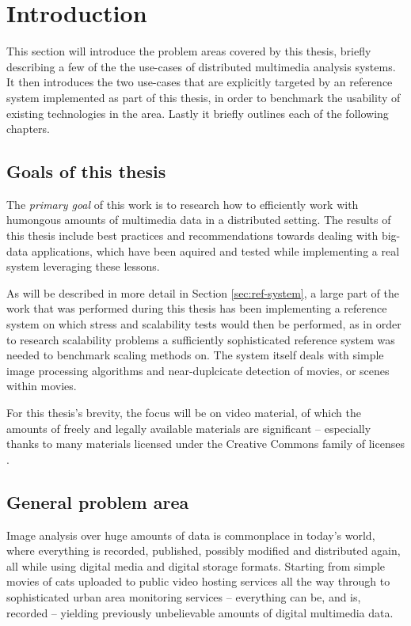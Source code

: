 \chapter{Introduction}
\label{cha:intro}

This section will introduce the problem areas covered by this thesis, briefly describing a few of the the use-cases of distributed multimedia analysis systems. It then introduces the two use-cases that are explicitly targeted by an reference system implemented as part of this thesis, in order to benchmark the usability of existing technologies in the area. Lastly it briefly outlines each of the following chapters.


\section{Goals of this thesis}
The \textit{primary goal} of this work is to research how to efficiently work with humongous amounts of multimedia data in a distributed setting. The results of this thesis include best practices and recommendations towards dealing with big-data applications, which have been aquired and tested while implementing a real system leveraging these lessons. 

As will be described in more detail in Section \ref{sec:ref-system}, a large part of the work that was performed during this thesis has been implementing a reference system on which stress and scalability tests would then be performed, as in order to research scalability problems a sufficiently sophisticated reference system was needed to benchmark scaling methods on. The system itself deals with simple image processing algorithms and near-duplcicate detection of movies, or scenes within movies.

For this thesis's brevity, the focus will be on video material, of which the amounts of freely and legally  available materials are significant -- especially thanks to many materials licensed under the Creative Commons family of licenses \cite{creative-commons}.


\section{General problem area}
Image analysis over huge amounts of data is commonplace in today's world, where everything is recorded, published, possibly modified and distributed again, all while using digital media and digital storage formats. Starting from simple movies of cats uploaded to public video hosting services all the way through to sophisticated urban area monitoring services -- everything can be, and is, recorded -- yielding previously unbelievable amounts of digital multimedia data.

